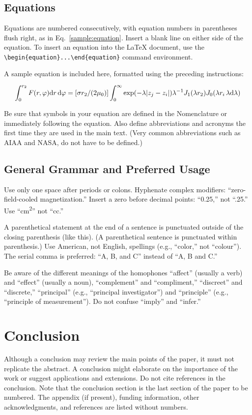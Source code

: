 \documentclass[journal]{new-aiaa}
\begin{document}
\subsection{Equations}
Equations are numbered consecutively, with equation numbers in parentheses flush right, as in Eq.~\eqref{sample:equation}. Insert a blank line on either side of the equation. To insert an equation into the \LaTeX{} document, use the \verb|\begin{equation}...\end{equation}| command environment.

A sample equation is included here, formatted using the preceding instructions:

\begin{equation}
\label{sample:equation}
\int^{r_2}_0 F(r,\varphi){\rm d}r\,{\rm d}\varphi = [\sigma r_2/(2\mu_0)]\int^{\infty}_0\exp(-\lambda|z_j-z_i|)\lambda^{-1}J_1 (\lambda r_2)J_0 (\lambda r_i\,\lambda {\rm d}\lambda)
\end{equation}

Be sure that symbols in your equation are defined in the Nomenclature or immediately following the equation. Also define abbreviations and acronyms the first time they are used in the main text. (Very common abbreviations such as AIAA and NASA, do not have to be defined.)

\subsection{General Grammar and Preferred Usage}
Use only one space after periods or colons. Hyphenate complex modifiers: ``zero-field-cooled magnetization.'' Insert a zero before decimal points: ``0.25,'' not ``.25.'' Use ``\si{\centi\meter\squared}'' not ``cc.'' 

A parenthetical statement at the end of a sentence is punctuated outside of the closing parenthesis (like this). (A parenthetical sentence is punctuated within parenthesis.) Use American, not English, spellings (e.g., “color,” not “colour”). The serial comma is preferred: “A, B, and C” instead of “A, B and C.”

Be aware of the different meanings of the homophones “affect” (usually a verb) and “effect” (usually a noun), “complement” and “compliment,” “discreet” and “discrete,” “principal” (e.g., “principal investigator”) and “principle” (e.g., “principle of measurement”). Do not confuse “imply” and “infer.”

\section{Conclusion}
Although a conclusion may review the main points of the paper, it must not replicate the abstract. A conclusion might elaborate on the importance of the work or suggest applications and extensions. Do not cite references in the conclusion. Note that the conclusion section is the last section of the paper to be numbered. The appendix (if present), funding information, other acknowledgments, and references are listed without numbers.
\end{document}
